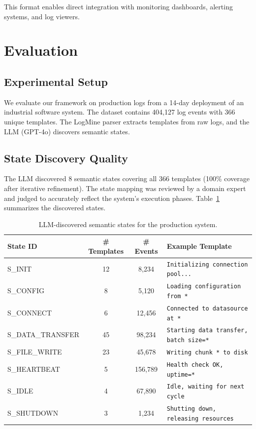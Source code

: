 \documentclass[11pt]{article}
\begin{document}
This format enables direct integration with monitoring dashboards, alerting systems, and log viewers.

\section{Evaluation}
\label{sec:evaluation}

\subsection{Experimental Setup}

We evaluate our framework on production logs from a 14-day deployment of an industrial software system. The dataset contains 404,127 log events with 366 unique templates. The LogMine parser extracts templates from raw logs, and the LLM (GPT-4o) discovers semantic states.

\subsection{State Discovery Quality}

The LLM discovered 8 semantic states covering all 366 templates (100\% coverage after iterative refinement). The state mapping was reviewed by a domain expert and judged to accurately reflect the system's execution phases. Table~\ref{tab:states} summarizes the discovered states.

\begin{table}[h]
    \centering
    \caption{LLM-discovered semantic states for the production system.}
    \label{tab:states}
    \begin{tabular}{lccp{5cm}}
        \toprule
        \textbf{State ID} & \textbf{\# Templates} & \textbf{\# Events} & \textbf{Example Template} \\
        \midrule
        S\_INIT            & 12 & 8,234 & \texttt{Initializing connection pool...} \\
        S\_CONFIG          & 8  & 5,120 & \texttt{Loading configuration from *} \\
        S\_CONNECT         & 6  & 12,456 & \texttt{Connected to datasource at *} \\
        S\_DATA\_TRANSFER   & 45 & 98,234 & \texttt{Starting data transfer, batch size=*} \\
        S\_FILE\_WRITE      & 23 & 45,678 & \texttt{Writing chunk * to disk} \\
        S\_HEARTBEAT       & 5  & 156,789 & \texttt{Health check OK, uptime=*} \\
        S\_IDLE            & 4  & 67,890 & \texttt{Idle, waiting for next cycle} \\
        S\_SHUTDOWN        & 3  & 1,234 & \texttt{Shutting down, releasing resources} \\
        \bottomrule
    \end{tabular}
\end{table}
\end{document}

